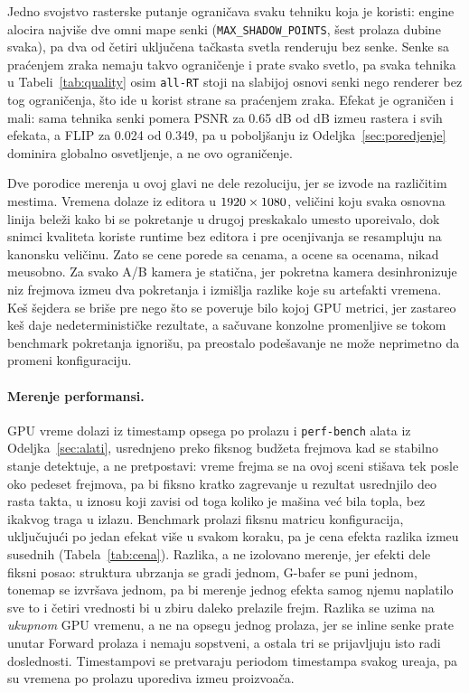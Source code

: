 Jedno svojstvo rasterske putanje ograni\v{c}ava svaku tehniku koja je koristi: engine alocira najvi\v{s}e dve
omni mape senki (\texttt{MAX\_SHADOW\_POINTS}, \v{s}est prolaza dubine svaka), pa dva od \v{c}etiri uklju\v{c}ena
ta\v{c}kasta svetla renderuju bez senke. Senke sa pra\'cenjem zraka nemaju takvo ograni\v{c}enje i prate svako svetlo, pa
svaka tehnika u Tabeli~\ref{tab:quality} osim \texttt{all-RT} stoji na slabijoj osnovi senki
nego renderer bez tog ograni\v{c}enja, \v{s}to ide u korist strane sa pra\'cenjem zraka. Efekat je ograni\v{c}en i
mali: sama tehnika senki pomera PSNR za 0.65 dB od \qRtLiftPsnr{} dB izme\dj{}u rastera i svih efekata,
a FLIP za 0.024 od 0.349, pa u pobolj\v{s}anju iz Odeljka~\ref{sec:poredjenje} dominira globalno
osvetljenje, a ne ovo ograni\v{c}enje.

Dve porodice merenja u ovoj glavi ne dele rezoluciju, jer se izvode na razli\v{c}itim mestima. Vremena dolaze iz editora u
$1920{} \times 1080{}$, veli\v{c}ini koju svaka osnovna linija bele\v{z}i kako bi se pokretanje u drugoj
preskakalo umesto upore\dj ivalo, dok snimci kvaliteta koriste runtime bez editora i
pre ocenjivanja se resampluju na kanonsku veli\v{c}inu. Zato se cene porede sa cenama, a ocene sa ocenama, nikad
me\dj{}usobno. Za svako A/B kamera je statična,
jer pokretna kamera desinhronizuje niz frejmova izme\dj{}u dva pokretanja i izmi\v{s}lja razlike koje su
artefakti vremena. Ke\v{s} \v{s}ejdera se bri\v{s}e pre nego \v{s}to se poveruje bilo kojoj GPU metrici, jer
zastareo ke\v{s} daje nedeterministi\v{c}ke rezultate, a sa\v{c}uvane konzolne promenljive se tokom benchmark pokretanja ignori\v{s}u, pa preostalo pode\v{s}avanje ne mo\v{z}e neprimetno da promeni konfiguraciju.

\paragraph{Merenje performansi.} GPU vreme dolazi iz timestamp opsega po prolazu i
\texttt{perf-bench} alata iz Odeljka~\ref{sec:alati}, usrednjeno preko fiksnog bud\v{z}eta frejmova kad se
stabilno stanje detektuje, a ne pretpostavi: vreme frejma se na ovoj sceni sti\v{s}ava tek posle oko pedeset frejmova, pa bi
fiksno kratko zagrevanje u rezultat usrednjilo deo rasta takta, u iznosu koji zavisi od toga koliko je ma\v{s}ina ve\'c bila topla, bez ikakvog traga u izlazu.
Benchmark prolazi fiksnu matricu konfiguracija, uklju\v{c}uju\'ci po jedan efekat vi\v{s}e u svakom koraku, pa je
cena efekta razlika izme\dj{}u susednih (Tabela~\ref{tab:cena}). Razlika, a ne izolovano merenje, jer
efekti dele fiksni posao: struktura ubrzanja se gradi jednom, G-bafer se puni jednom, tonemap se izvr\v{s}ava jednom, pa bi merenje jednog efekta samog njemu
naplatilo sve to i \v{c}etiri vrednosti bi u zbiru daleko prelazile frejm. Razlika se uzima na \emph{ukupnom}
GPU vremenu, a ne na opsegu jednog prolaza, jer se inline senke prate unutar Forward prolaza i
nemaju sopstveni, a ostala tri se prijavljuju isto radi doslednosti. Timestampovi se
pretvaraju periodom timestampa svakog ure\dj{}aja, pa su vremena po prolazu uporediva izme\dj{}u proizvo\dj a\v{c}a.

